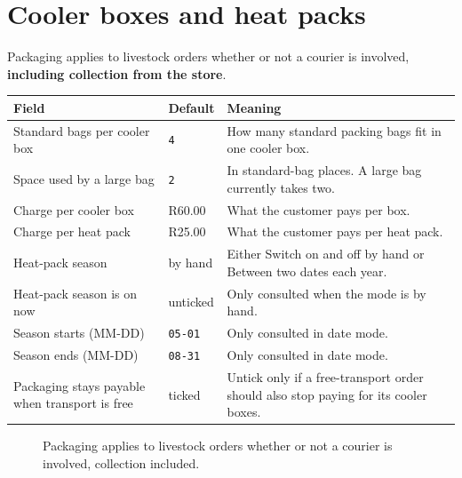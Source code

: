 \documentclass[11pt,a4paper,oneside]{report}
\newcommand{\opt}[1]{\texttt{\small #1}}
\newcommand{\R}[1]{R#1}
\newcommand{\yes}{\textsf{ticked}}
\newcommand{\no}{\textsf{unticked}}
\begin{document}
\section{Cooler boxes and heat packs}

Packaging applies to livestock orders whether or not a courier is involved,
\textbf{including collection from the store}.

\begin{longtable}{@{}L{5.0cm}L{2.2cm}L{7.4cm}@{}}
\toprule
\textbf{Field} & \textbf{Default} & \textbf{Meaning}\\
\midrule
\endhead
Standard bags per cooler box & \opt{4} & How many standard packing bags fit in one cooler box.\\
\addlinespace
Space used by a large bag & \opt{2} & In standard-bag places. A large bag currently takes two.\\
\addlinespace
Charge per cooler box & \R{60.00} & What the customer pays per box.\\
\addlinespace
Charge per heat pack & \R{25.00} & What the customer pays per heat pack.\\
\addlinespace
Heat-pack season & \textsf{by hand} & Either \textsf{Switch on and off by hand} or \textsf{Between two dates each year}.\\
\addlinespace
Heat-pack season is on now & \no & Only consulted when the mode is \textsf{by hand}.\\
\addlinespace
Season starts (MM-DD) & \opt{05-01} & Only consulted in date mode.\\
\addlinespace
Season ends (MM-DD) & \opt{08-31} & Only consulted in date mode.\\
\addlinespace
Packaging stays payable when transport is free & \yes & Untick only if a free-transport order should also stop paying for its cooler boxes.\\
\bottomrule
\end{longtable}

\begin{figure}[H]
\centering
{}
\caption{Packaging applies to livestock orders whether or not a courier is
involved, collection included.}
\label{fig:settings-packaging}
\end{figure}
\end{document}

